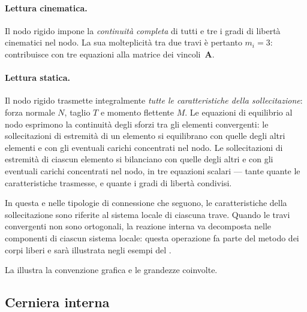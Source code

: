 \paragraph{Lettura cinematica.}
Il nodo rigido impone la \emph{continuità completa}
di tutti e tre i gradi di libertà cinematici nel nodo.
La sua molteplicità tra due travi è pertanto $m_i = 3$:
contribuisce con tre equazioni alla matrice dei vincoli~$\bm{A}$.

\paragraph{Lettura statica.}
Il nodo rigido trasmette integralmente \emph{tutte le
	caratteristiche della sollecitazione}: forza normale $N$,
taglio $T$ e momento flettente $M$.
Le equazioni di equilibrio al nodo esprimono la continuità
degli sforzi tra gli elementi convergenti: le sollecitazioni
di estremità di un elemento si equilibrano con quelle degli
altri elementi e con gli eventuali carichi concentrati nel
nodo. Le sollecitazioni di estremità di ciascun elemento si bilanciano
con quelle degli altri e con gli eventuali carichi concentrati nel
nodo, in tre equazioni scalari --- tante quante le caratteristiche
trasmesse, e quante i gradi di libertà condivisi.

In questa e nelle tipologie di connessione che seguono,
le caratteristiche della sollecitazione sono riferite al
sistema locale di ciascuna trave. Quando le travi
convergenti non sono ortogonali, la reazione interna
va decomposta nelle componenti di ciascun sistema locale:
questa operazione fa parte del metodo dei corpi liberi
e sarà illustrata negli esempi del .


La  illustra la convenzione
grafica e le grandezze coinvolte.








\subsection{Cerniera interna}
\label{subsec:cerniera_interna}

